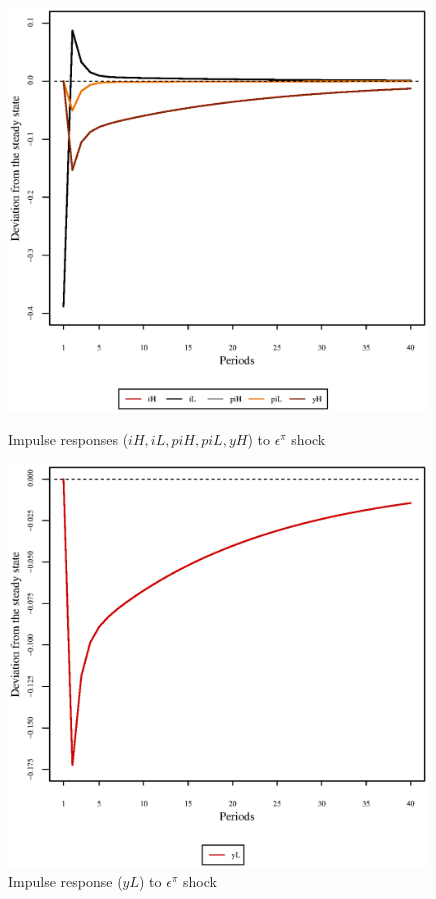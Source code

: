 \begin{figure}[h]
\begin{minipage}{0.5\textwidth}
\vspace*{-3em}
\centering
\includegraphics[width=0.99\textwidth, scale=0.55]{plots/plot_16.eps}
\caption{Impulse responses (${i\!H}, {i\!L}, {p\!i\!H}, {p\!i\!L}, {y\!H}$) to $\epsilon^{\pi}$ shock}
\end{minipage}
\begin{minipage}{0.5\textwidth}
\vspace*{-3em}
\centering
\includegraphics[width=0.99\textwidth, scale=0.55]{plots/plot_17.eps}
\caption{Impulse response (${y\!L}$) to $\epsilon^{\pi}$ shock}
\end{minipage}
\end{figure}



